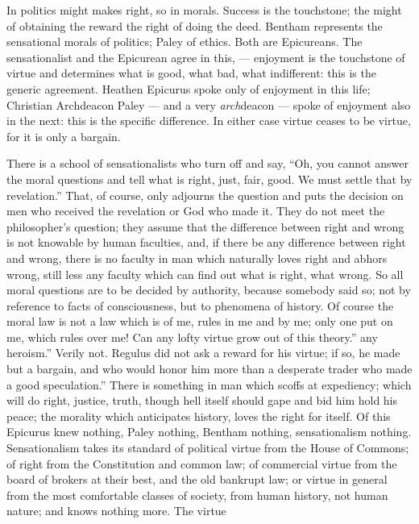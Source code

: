\documentclass[12pt]{article}
\begin{document}
In politics might makes right, so in morals. Success is the touchstone; the might of obtaining the reward the right of doing the deed. Bentham represents 
the sensational morals of politics; Paley of ethics. Both 
are Epicureans. The sensationalist and the Epicurean 
agree in this, --- enjoyment is the touchstone of virtue 
and determines what is good, what bad, what indifferent: this is the generic agreement. Heathen Epicurus 
spoke only of enjoyment in this life; Christian Archdeacon Paley --- and a very \emph{arch}deacon --- spoke of 
enjoyment also in the next: this is the specific difference. In either case virtue ceases to be virtue, for it 
is only a bargain. 




There is a school of sensationalists who turn off and 
say, ``Oh, you cannot answer the moral questions and 
tell what is right, just, fair, good. We must settle 
that by revelation.'' That, of course, only adjourns 
the question and puts the decision on men who received 
the revelation or God who made it. They do not meet 
the philosopher's question; they assume that the difference between right and wrong is not knowable by 
human faculties, and, if there be any difference between 
right and wrong, there is no faculty in man which naturally loves right and abhors wrong, still less any faculty which can find out what is right, what wrong. So 
all moral questions are to be decided by authority, because somebody said so; not by reference to facts of 
consciousness, but to phenomena of history. Of course 
the moral law is not a law which is of me, rules in me 
and by me; only one put on me, which rules over me! 
Can any lofty virtue grow out of this theory.'' any 
heroism.'' Verily not. Regulus did not ask a reward 
for his virtue; if so, he made but a bargain, and who 
would honor him more than a desperate trader who 
made a good speculation.'' There is something in man 
which scoffs at expediency; which will do right, justice, 
truth, though hell itself should gape and bid him hold 
his peace; the morality which anticipates history, loves 
the right for itself. Of this Epicurus knew nothing, 
Paley nothing, Bentham nothing, sensationalism nothing. Sensationalism takes its standard of political 
virtue from the House of Commons; of right from the 
Constitution and common law; of commercial virtue 
from the board of brokers at their best, and the old 
bankrupt law; or virtue in general from the most comfortable classes of society, from human history, not 
human nature; and knows nothing more. The virtue 
\end{document}
